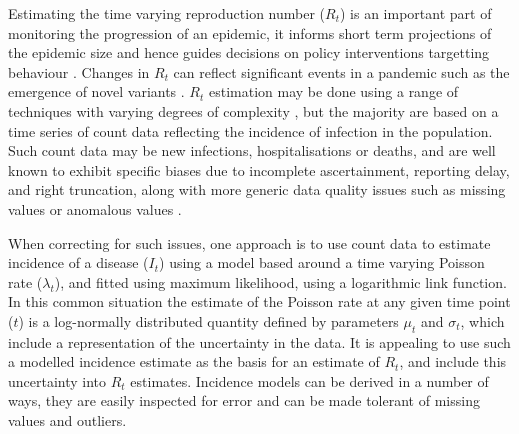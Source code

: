 \documentclass[10pt,letterpaper]{article}
\begin{document}
Estimating the time varying reproduction number ($R_t$) is an important part of monitoring the progression of an epidemic, it informs short term projections of the epidemic size and hence guides decisions on policy interventions targetting behaviour \cite{gostic2020}. Changes in $R_t$ can reflect significant events in a pandemic such as the emergence of novel variants \cite{davies2021}. $R_t$ estimation may be done using a range of techniques with varying degrees of complexity \cite{abbott2024,alvarez2021,parag2021,thompson2019,wallinga2006,steyn2024,nash2023,nash2022,cauchemez2006,hong2020,johnson2021,ogi-gittins2024}, but the majority are based on a time series of count data reflecting the incidence of infection in the population. Such count data may be new infections, hospitalisations or deaths, and are well known to exhibit specific biases due to incomplete ascertainment, reporting delay, and right truncation, along with more generic data quality issues such as missing values or anomalous values \cite{abbott2020}.

When correcting for such issues, one approach is to use count data to estimate incidence of a disease ($I_t$) using a model based around a time varying Poisson rate ($\lambda_t$), and fitted using maximum likelihood, using a logarithmic link function. In this common situation the estimate of the Poisson rate at any given time point ($t$) is a log-normally distributed quantity defined by parameters $\mu_t$ and $\sigma_t$, which include a representation of the uncertainty in the data. It is appealing to use such a modelled incidence estimate as the basis for an estimate of $R_t$, and include this uncertainty into $R_t$ estimates. Incidence models can be derived in a number of ways, they are easily inspected for error and can be made tolerant of missing values and outliers.
\end{document}
